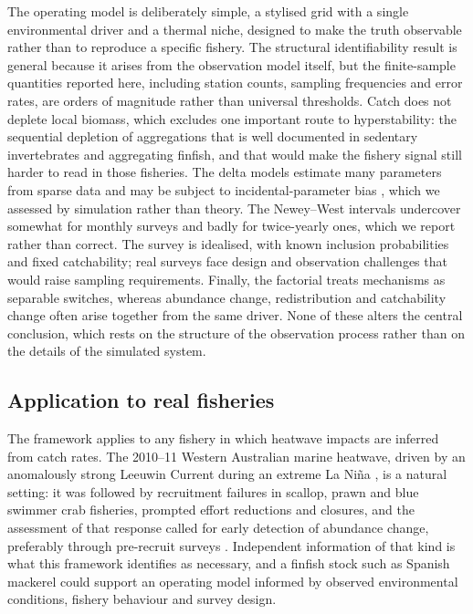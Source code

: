 \documentclass[11pt,a4paper]{article}
\begin{document}
The operating model is deliberately simple, a stylised grid with a single environmental driver and a thermal niche, designed to make the truth observable rather than to reproduce a specific fishery. The structural identifiability result is general because it arises from the observation model itself, but the finite-sample quantities reported here, including station counts, sampling frequencies and error rates, are orders of magnitude rather than universal thresholds. Catch does not deplete local biomass, which excludes one important route to hyperstability: the sequential depletion of aggregations that is well documented in sedentary invertebrates and aggregating finfish, and that would make the fishery signal still harder to read in those fisheries. The delta models estimate many parameters from sparse data and may be subject to incidental-parameter bias \citep{neyman1948}, which we assessed by simulation rather than theory. The Newey--West intervals undercover somewhat for monthly surveys and badly for twice-yearly ones, which we report rather than correct. The survey is idealised, with known inclusion probabilities and fixed catchability; real surveys face design and observation challenges that would raise sampling requirements. Finally, the factorial treats mechanisms as separable switches, whereas abundance change, redistribution and catchability change often arise together from the same driver. None of these alters the central conclusion, which rests on the structure of the observation process rather than on the details of the simulated system.

\subsection{Application to real fisheries}

The framework applies to any fishery in which heatwave impacts are inferred from catch rates. The 2010--11 Western Australian marine heatwave, driven by an anomalously strong Leeuwin Current during an extreme La Ni\~{n}a \citep{pearce2013,feng2013}, is a natural setting: it was followed by recruitment failures in scallop, prawn and blue swimmer crab fisheries, prompted effort reductions and closures, and the assessment of that response called for early detection of abundance change, preferably through pre-recruit surveys \citep{caputi2016,caputi2019}. Independent information of that kind is what this framework identifies as necessary, and a finfish stock such as Spanish mackerel could support an operating model informed by observed environmental conditions, fishery behaviour and survey design.
\end{document}
